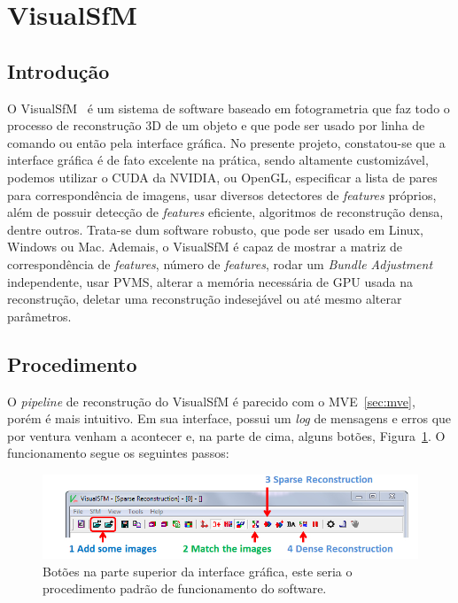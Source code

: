 \section{VisualSfM}\label{sec:visualsfm}
%
\subsection*{Introdução}

O VisualSfM~\cite{wu2011visualsfm} é um sistema de software baseado em fotogrametria
que faz todo o processo de reconstrução 3D de um objeto e que pode ser usado por
linha de comando ou então pela interface gráfica. No presente projeto, constatou-se
que a interface gráfica é de fato excelente na prática, sendo
altamente customizável, podemos utilizar o CUDA da NVIDIA, ou OpenGL,
especificar a lista de pares para correspondência de imagens, usar diversos detectores de
\emph{features} próprios, além de possuir detecção de \emph{features} eficiente, 
algoritmos de reconstrução densa, dentre outros. Trata-se dum software
robusto, que pode ser usado em Linux, Windows ou Mac.
Ademais, o VisualSfM é capaz de mostrar a matriz de correspondência de
\emph{features}, número de \emph{features}, rodar um \emph{Bundle Adjustment}
independente, usar PVMS, alterar a memória necessária de GPU usada na
reconstrução, deletar uma reconstrução indesejável ou até mesmo alterar
parâmetros.

\subsection*{Procedimento}

O \emph{pipeline} de reconstrução do VisualSfM é parecido com o MVE~\ref{sec:mve}, porém é mais
intuitivo. Em sua interface, possui um \emph{log} de mensagens e erros que por ventura
venham a acontecer e, na parte de cima, alguns botões,
Figura~\ref{fig:pipelineVisualSfM}. O funcionamento segue os seguintes passos:

\begin{figure}
	\centering
	\includegraphics[width=1\linewidth]{figs/pipelinevisualsfm.png}
	\caption{%
	Botões na parte superior da interface gráfica, este seria o procedimento padrão de funcionamento do software.
	\protect\cite{wu2011visualsfm}
	}\label{fig:pipelineVisualSfM}
\end{figure}

